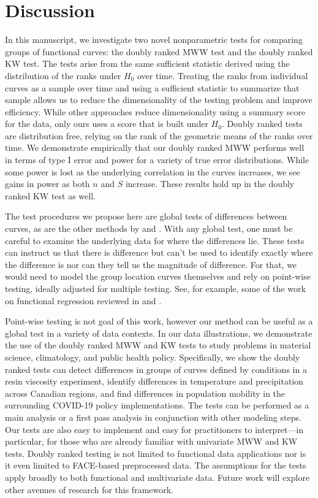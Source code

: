 \documentclass[12pt]{article}
\theoremstyle{plain}
\begin{document}
	\section{Discussion}
	\label{s:disc}
	
	In this manuscript, we investigate two novel nonparametric tests for comparing groups of functional curves: the doubly ranked MWW test and the doubly ranked KW test. The tests arise from the same sufficient statistic derived using the distribution of the ranks under $H_0$ over time. Treating the ranks from individual curves as a sample over time and using a sufficient statistic to summarize that sample allows us to reduce the dimensionality of the testing problem and improve efficiency. While other approaches reduce dimensionality using a summary score for the data, only ours uses a score that is built under $H_0$. Doubly ranked tests are distribution free, relying on the rank of the geometric means of the ranks over time. We demonstrate empirically that our doubly ranked MWW performs well in terms of type I error and power for a variety of true error distributions. While some power is lost as the underlying correlation in the curves increases, we see gains in power as both $n$ and $S$ increase. These results hold up in the doubly ranked KW test as well.
	
	The test procedures we propose here are global tests of differences between curves, as are the other methods by \cite{Hall2007,Lopez2009,Lopez2010,Chak2015} and \cite{Melendez2021}. With any global test, one must be careful to examine the underlying data for where the differences lie. These tests can instruct us that there is difference but can't be used to identify exactly where the difference is nor can they tell us the magnitude of difference. For that, we would need to model the group location curves themselves and rely on point-wise testing, ideally adjusted for multiple testing. See, for example, some of the work on functional regression reviewed in \cite{Morris2015} and \cite{Greven2017}.
	
	Point-wise testing is not goal of this work, however our method can be useful as a global test in a variety of data contexts. In our data illustrations, we demonstrate the use of the doubly ranked MWW and KW tests to study problems in material science, climatology, and public health policy. Specifically, we show the doubly ranked tests can detect differences in groups of curves defined by conditions in a resin viscosity experiment, identify differences in temperature and precipitation across Canadian regions, and find differences in population mobility in the surrounding COVID-19 policy implementations. The tests can be performed as a main analysis or a first pass analysis in conjunction with other modeling steps. Our tests are also easy to implement and easy for practitioners to interpret---in particular, for those who are already familiar with univariate MWW and KW tests. Doubly ranked testing is not limited to functional data applications nor is it even limited to FACE-based preprocessed data. The assumptions for the tests apply broadly to both functional and multivariate data. Future work will explore other avenues of research for this framework.
\end{document}
